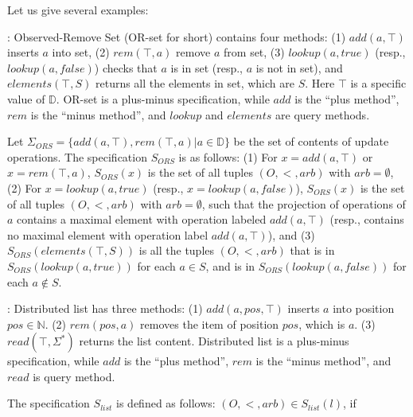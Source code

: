 Let us give several examples:

: Observed-Remove Set (OR-set for short) \cite{Shapiro:2011,Bieniusa:2012} contains four methods: (1) $add(a,\top)$ inserts $a$ into set, (2) $rem(\top,a)$ remove $a$ from set, (3) $lookup(a, \textit{true})$ (resp., $lookup(a, \textit{false})$) checks that $a$ is in set (resp., $a$ is not in set), and $elements(\top, S)$ returns all the elements in set, which are $S$. Here $\top$ is a specific value of $\mathbb{D}$. OR-set is a plus-minus specification, while $add$ is the ``plus method'', $rem$ is the ``minus method'', and $lookup$ and $elements$ are query methods.


Let $\Sigma_{\textit{ORS}} = \{ add(a,\top),rem(\top,a) \vert a \in \mathbb{D} \}$ be the set of contents of update operations. The specification $S_{\textit{ORS}}$ is as follows: (1) For $x=add(a,\top)$ or $x = rem(\top,a)$, $S_{\textit{ORS}}(x)$ is the set of all tuples $(O,<,arb)$ with $arb = \emptyset$, (2) For $x=lookup(a,\textit{true})$ (resp., $x=lookup(a,\textit{false})$), $S_{\textit{ORS}}(x)$ is the set of all tuples $(O,<,arb)$ with $arb = \emptyset$, such that the projection of operations of $a$ contains a maximal element with operation labeled $add(a,\top)$ (resp., contains no maximal element with operation label $add(a,\top)$), and (3) $S_{\textit{ORS}}(elements(\top,S))$ is all the tuples $(O,<,arb)$ that is in $S_{\textit{ORS}}(lookup(a,\textit{true}))$ for each $a \in S$, and is in $S_{\textit{ORS}}(lookup(a,\textit{false}))$ for each $a \notin S$.

: Distributed list has three methods: (1) $add(a,pos,\top)$ inserts $a$ into position $pos \in \mathbb{N}$. (2) $rem(pos,a)$ removes the item of position $pos$, which is $a$. (3) $read(\top,\Sigma^*)$ returns the list content. Distributed list is a plus-minus specification, while $add$ is the ``plus method'', $rem$ is the ``minus method'', and $read$ is query method. %

The specification $S_{\textit{list}}$ is defined as follows: $(O,<,arb) \in S_{\textit{list}}(l)$, if

